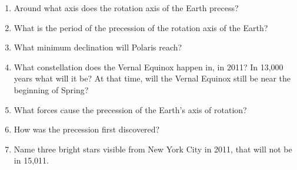 
\begin{enumerate}
\item Around what axis does the rotation axis of the Earth precess?
\vspace{80pt}
\item What is the period of the precession of the rotation axis of the
  Earth?
\vspace{80pt}
\item What minimum declination will Polaris reach?
\vspace{80pt}
\item What constellation does the Vernal Equinox happen in, in 2011?
  In 13,000 years what will it be? At that time, will the Vernal
  Equinox still be near the beginning of Spring?
\vspace{80pt}
\item What forces cause the precession of the Earth's axis of
  rotation?
\vspace{80pt}
\item How was the precession first discovered?
\vspace{80pt}
\item Name three bright stars visible from New York City in 2011, that
  will not be in 15,011.
\vspace{80pt}
\end{enumerate}
